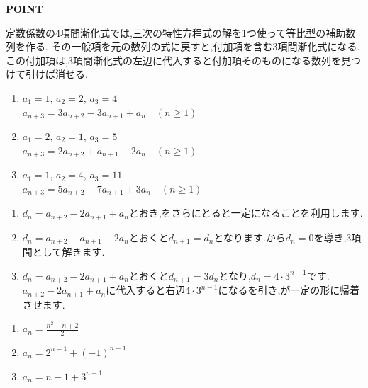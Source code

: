 \begin{bookpoint}
  \textbf{POINT}\par
  定数係数の4項間漸化式では,三次の特性方程式の解を1つ使って等比型の補助数列を作る.
  その一般項を元の数列の式に戻すと,付加項を含む3項間漸化式になる.
  この付加項は,3項間漸化式の左辺に代入すると付加項そのものになる数列を見つけて引けば消せる.
\end{bookpoint}

\noindent {}\par\nobreak
\begin{enumerate}[label=(\arabic*),parsep=3pt,format=\bookitemlink{example-four-term-1}{problem}{hint}]
  \item $a_1=1,\,a_2=2,\,a_3=4$\\
    $a_{n+3}=3a_{n+2}-3a_{n+1}+a_n\quad(n\ge1)$
  \item $a_1=2,\,a_2=1,\,a_3=5$\\
    $a_{n+3}=2a_{n+2}+a_{n+1}-2a_n\quad(n\ge1)$
  \item $a_1=1,\,a_2=4,\,a_3=11$\\
    $a_{n+3}=5a_{n+2}-7a_{n+1}+3a_n\quad(n\ge1)$
\end{enumerate}

\noindent{}\par\nobreak
\begin{enumerate}[label=(\arabic*),parsep=3pt,format=\bookitemlink{example-four-term-1}{hint}{answer}]
  \item $d_n=a_{n+2}-2a_{n+1}+a_n$とおき,をさらにとると一定になることを利用します.
  \item $d_n=a_{n+2}-a_{n+1}-2a_n$とおくと$d_{n+1}=d_n$となります.から$d_n=0$を導き,3項間として解きます.
  \item $d_n=a_{n+2}-2a_{n+1}+a_n$とおくと$d_{n+1}=3d_n$となり,$d_n=4\cdot3^{n-1}$です.$a_{n+2}-2a_{n+1}+a_n$に代入すると右辺$4\cdot3^{n-1}$になるを引き,が一定の形に帰着させます.
\end{enumerate}

\noindent{}\par\nobreak
\begin{enumerate}[label=(\arabic*),parsep=3pt,format=\bookitemlink{example-four-term-1}{answer}{solution}]
  \item $a_n=\frac{n^2-n+2}{2}$
  \item $a_n=2^{n-1}+(-1)^{n-1}$
  \item $a_n=n-1+3^{n-1}$
\end{enumerate}

